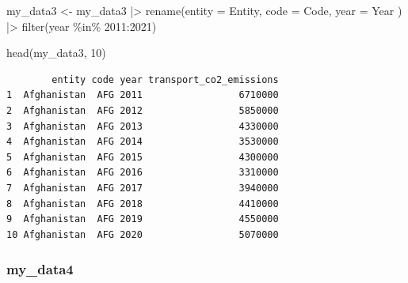 \documentclass[
  11pt,
  a4paper,
  DIV=11,
  numbers=noendperiod]{scrartcl}
\newenvironment{Shaded}{\begin{snugshade}}{\end{snugshade}}
\newcommand{\AttributeTok}[1]{\textcolor[rgb]{0.40,0.45,0.13}{#1}}
\newcommand{\DecValTok}[1]{\textcolor[rgb]{0.68,0.00,0.00}{#1}}
\newcommand{\FunctionTok}[1]{\textcolor[rgb]{0.28,0.35,0.67}{#1}}
\newcommand{\NormalTok}[1]{\textcolor[rgb]{0.00,0.23,0.31}{#1}}
\newcommand{\OtherTok}[1]{\textcolor[rgb]{0.00,0.23,0.31}{#1}}
\newcommand{\SpecialCharTok}[1]{\textcolor[rgb]{0.37,0.37,0.37}{#1}}
\begin{document}
\begin{Shaded}
\begin{Highlighting}[]
\NormalTok{my\_data3 }\OtherTok{\textless{}{-}}\NormalTok{ my\_data3 }\SpecialCharTok{|\textgreater{}}
  \FunctionTok{rename}\NormalTok{(}\AttributeTok{entity =}\NormalTok{ Entity,}
         \AttributeTok{code =}\NormalTok{ Code,}
         \AttributeTok{year =}\NormalTok{ Year}
\NormalTok{  ) }\SpecialCharTok{|\textgreater{}}
  \FunctionTok{filter}\NormalTok{(year }\SpecialCharTok{\%in\%} \DecValTok{2011}\SpecialCharTok{:}\DecValTok{2021}\NormalTok{)}

\FunctionTok{head}\NormalTok{(my\_data3, }\DecValTok{10}\NormalTok{)}
\end{Highlighting}
\end{Shaded}

\begin{verbatim}
        entity code year transport_co2_emissions
1  Afghanistan  AFG 2011                 6710000
2  Afghanistan  AFG 2012                 5850000
3  Afghanistan  AFG 2013                 4330000
4  Afghanistan  AFG 2014                 3530000
5  Afghanistan  AFG 2015                 4300000
6  Afghanistan  AFG 2016                 3310000
7  Afghanistan  AFG 2017                 3940000
8  Afghanistan  AFG 2018                 4410000
9  Afghanistan  AFG 2019                 4550000
10 Afghanistan  AFG 2020                 5070000
\end{verbatim}

\subsubsection{my\_data4}\label{my_data4}
\end{document}
